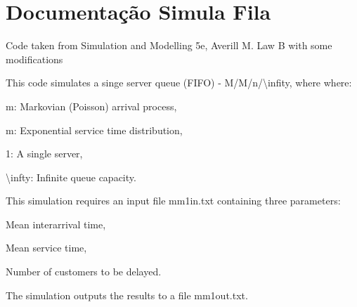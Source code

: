 \chapter{Documentação Simula Fila}
\hypertarget{index}{}\label{index}
Code taken from Simulation and Modelling 5e, Averill M. Law B with some modifications

This code simulates a singe server queue (FIFO) -\/ M/\+M/n/\textbackslash{}infity, where where\+:
\begin{DoxyItemize}
\item m\+: Markovian (Poisson) arrival process,
\item m\+: Exponential service time distribution,
\item 1\+: A single server,
\item \textbackslash{}infty\+: Infinite queue capacity.
\end{DoxyItemize}

This simulation requires an input file {\ttfamily mm1in.\+txt} containing three parameters\+:
\begin{DoxyEnumerate}
\item Mean interarrival time,
\item Mean service time,
\item Number of customers to be delayed.
\end{DoxyEnumerate}

The simulation outputs the results to a file {\ttfamily mm1out.\+txt}. 